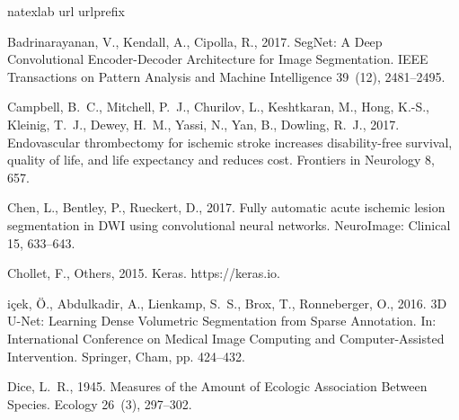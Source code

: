 \documentclass[letterpaper,final,authoryear,3p,times,twocolumn]{elsarticle}
\begin{document}
%


%
\begin{thebibliography}{36}
\expandafter\ifx\csname natexlab\endcsname\relax\def\natexlab#1{#1}\fi
\expandafter\ifx\csname url\endcsname\relax
  \def\url#1{\texttt{#1}}\fi
\expandafter\ifx\csname urlprefix\endcsname\relax\def\urlprefix{URL }\fi

Badrinarayanan, V., Kendall, A., Cipolla, R., 2017. {SegNet: A Deep
  Convolutional Encoder-Decoder Architecture for Image Segmentation}. IEEE
  Transactions on Pattern Analysis and Machine Intelligence 39~(12),
  2481--2495.

Campbell, B.~C., Mitchell, P.~J., Churilov, L., Keshtkaran, M., Hong, K.-S.,
  Kleinig, T.~J., Dewey, H.~M., Yassi, N., Yan, B., Dowling, R.~J., 2017.
  {Endovascular thrombectomy for ischemic stroke increases disability-free
  survival, quality of life, and life expectancy and reduces cost}. Frontiers
  in Neurology 8, 657.

Chen, L., Bentley, P., Rueckert, D., 2017. {Fully automatic acute ischemic
  lesion segmentation in DWI using convolutional neural networks}. NeuroImage:
  Clinical 15, 633--643.

Chollet, F., Others, 2015. {Keras}. https://keras.io.

i{\c{c}}ek, {\"{O}}., Abdulkadir, A., Lienkamp, S.~S., Brox, T.,
  Ronneberger, O., 2016. {3D U-Net: Learning Dense Volumetric Segmentation from
  Sparse Annotation}. In: International Conference on Medical Image Computing
  and Computer-Assisted Intervention. Springer, Cham, pp. 424--432.

Dice, L.~R., 1945. {Measures of the Amount of Ecologic Association Between
  Species}. Ecology 26~(3), 297--302.


\end{thebibliography}
\end{document}

